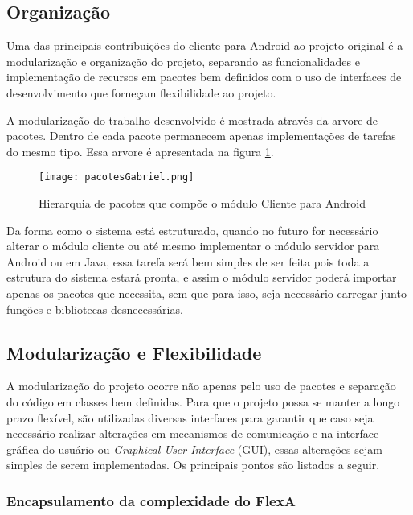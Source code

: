         \subsection{Organização}
        
        Uma das principais contribuições do cliente para Android ao projeto original é a modularização e organização do projeto, separando as funcionalidades e implementação de recursos em pacotes bem definidos com o uso de interfaces de desenvolvimento que forneçam flexibilidade ao projeto.
        
        A modularização do trabalho desenvolvido é mostrada através da arvore de pacotes. Dentro de cada pacote permanecem apenas implementações de tarefas do mesmo tipo. Essa arvore é apresentada na figura \ref{fig:arvorePacotesAndroid}.
        
        \begin{figure}[!ht]
        \centering
        \texttt{[image: pacotesGabriel.png]}
        \caption{Hierarquia de pacotes que compõe o módulo Cliente para Android}
        \label{fig:arvorePacotesAndroid}
        \end{figure}
        
        Da forma como o sistema está estruturado, quando no futuro for necessário alterar o módulo cliente ou até mesmo implementar o módulo servidor para Android ou em Java, essa tarefa será bem simples de ser feita pois toda a estrutura do sistema estará pronta, e assim o módulo servidor poderá importar apenas os pacotes que necessita, sem que para isso, seja necessário carregar junto funções e bibliotecas desnecessárias.
        
        \subsection{Modularização e Flexibilidade}
        
        A modularização do projeto ocorre não apenas pelo uso de pacotes e separação do código em classes bem definidas. Para que o projeto possa se manter a longo prazo flexível, são utilizadas diversas interfaces para garantir que caso seja necessário realizar alterações em mecanismos de comunicação e na interface gráfica do usuário ou \textit{Graphical User Interface} (GUI), essas alterações sejam simples de serem implementadas. Os principais pontos são listados a seguir.
        
         \subsubsection{Encapsulamento da complexidade do FlexA}
         
